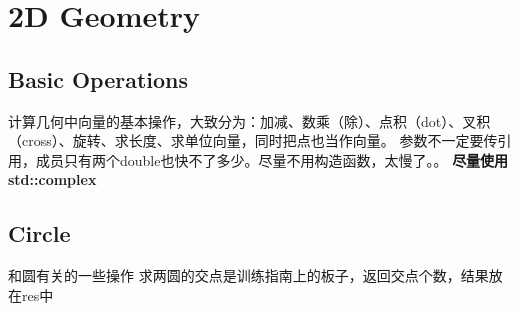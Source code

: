 \newpage
\section{2D Geometry}
	\subsection{Basic Operations}
		\begin{flushleft}
			计算几何中向量的基本操作，大致分为：加减、数乘（除）、点积（dot）、叉积（cross）、旋转、求长度、求单位向量，同时把点也当作向量。
			\linebreak 参数不一定要传引用，成员只有两个double也快不了多少。尽量不用构造函数，太慢了。。
			\linebreak \textbf{尽量使用std::complex}
		\end{flushleft}
		
		
	\newpage
	\subsection{Circle}
		\begin{flushleft}
			和圆有关的一些操作
			\linebreak 求两圆的交点是训练指南上的板子，返回交点个数，结果放在res中
		\end{flushleft}
		